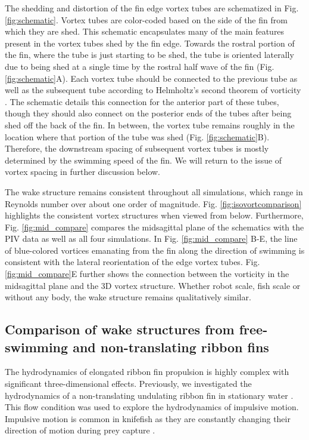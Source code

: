 \documentclass[onecolumn]{IEEEtran}
\begin{document}
The shedding and distortion of the fin edge vortex tubes are schematized in Fig.
\ref{fig:schematic}. Vortex tubes are color-coded based on the side of the
fin from which they are shed. This schematic encapsulates many of the main
features present in the vortex tubes shed by the fin edge. Towards the
rostral portion of the fin, where the tube is just starting to be shed,
the tube is oriented laterally due to being shed at a single time by the
rostral half wave of the fin (Fig. \ref{fig:schematic}A). Each vortex tube should be connected to the
previous tube as well as the subsequent tube according to 
Helmholtz's second theorem of vorticity \citep*{Sche50a}. The schematic
details this connection for the anterior part of these tubes, though they
should also connect on the posterior ends of the tubes after being shed off
the back of the fin. In between, the vortex tube remains roughly in the
location where that portion of the tube was shed (Fig. \ref{fig:schematic}B). Therefore, the
downstream spacing of subsequent vortex tubes is mostly determined by the
swimming speed of the fin. We will return to the issue of vortex spacing
in further discussion below.

The wake structure remains consistent throughout all
simulations, which range in Reynolds number over about one order of
magnitude. Fig. \ref{fig:isovortcomparison} highlights the consistent
vortex structures when viewed from below. Furthermore, Fig.
\ref{fig:mid_compare} compares the midsagittal plane of the schematics with
the PIV data as well as all four simulations. In Fig. \ref{fig:mid_compare}
B-E, the line of blue-colored vortices emanating from the fin along the
direction of swimming is consistent with the lateral reorientation of the
edge vortex tubes. Fig. \ref{fig:mid_compare}E further shows the connection
between the vorticity in the midsagittal plane and the 3D vortex
structure. Whether robot scale, fish scale or without any body, the wake
structure remains qualitatively similar.

\subsection{Comparison of wake structures from free-swimming and non-translating ribbon fins}

The hydrodynamics of elongated ribbon fin propulsion is highly complex
with significant three-dimensional effects. Previously, we investigated
the hydrodynamics of a non-translating undulating ribbon fin in stationary
water \citep*{Shir08a}. This flow condition was used to explore the
hydrodynamics of impulsive motion. Impulsive motion is common in knifefish
as they are constantly changing their direction of motion during prey capture \citep{MacI01a}.
\end{document}
